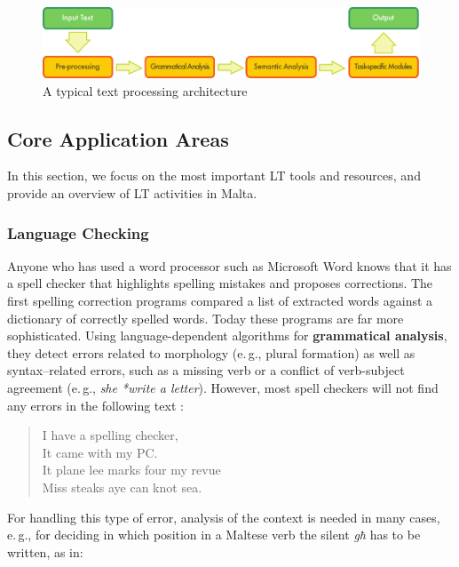 \documentclass[]{../../metanetpaper}
\begin{document}
\begin{multicols}{2}
\begin{figure}[htb]
  \center
  \includegraphics[width=\textwidth]{../_media/english/text_processing_app_architecture}
  \caption{A typical text processing architecture}
  \label{fig:textprocessingarch_en}
\end{figure}

\subsection{Core Application Areas}

In this section, we focus on the most important LT tools and resources, and provide an overview of LT activities in Malta. 

\subsubsection{Language Checking}

Anyone who has used a word processor such as Microsoft Word knows that it has a spell checker that highlights spelling mistakes and proposes corrections. The first spelling correction programs compared a list of extracted words against a dictionary of correctly spelled words. Today these programs are far more sophisticated. Using language-dependent algorithms for \textbf{grammatical analysis}, they detect errors related to morphology (e.\,g., plural formation) as well as syntax–related errors, such as a missing verb or a conflict of verb-subject agreement (e.\,g., \textit{she *write a letter}). However, most spell checkers will not find any errors in the following text \cite{zar1}:

\begin{quote}
  I have a spelling checker,\\
  It came with my PC.\\
  It plane lee marks four my revue\\
  Miss steaks aye can knot sea.
\end{quote}

For handling this type of error, analysis of the context is needed in many cases, e.\,g., for deciding in which position in a Maltese verb the silent \emph{għ} has to be written, as in:


\end{multicols}
\end{document}
